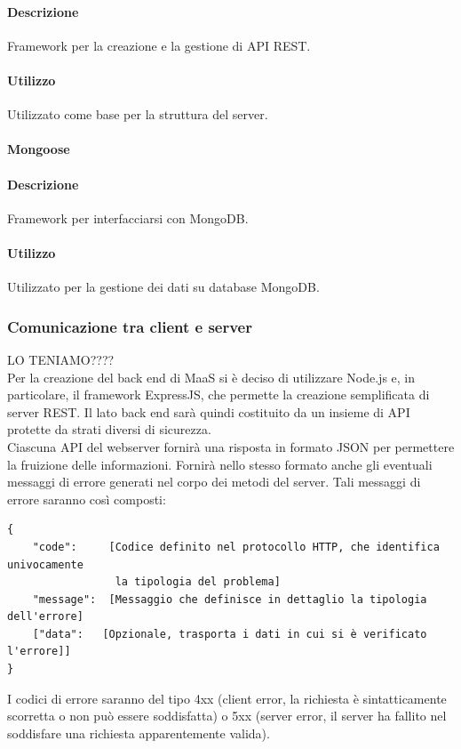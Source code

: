 \paragraph*{Descrizione}
Framework per la creazione e la gestione di API REST.

\paragraph*{Utilizzo}
Utilizzato come base per la struttura del server.

\paragraph{Mongoose}
\paragraph*{Descrizione}
Framework per interfacciarsi con MongoDB.

\paragraph*{Utilizzo}
Utilizzato per la gestione dei dati su database MongoDB.


\subsubsection{Comunicazione tra client e server}
\huge{LO TENIAMO????}\\
Per la creazione del back end di MaaS si è deciso di utilizzare Node.js e, in particolare, il framework ExpressJS, che permette la creazione semplificata di server REST. Il lato back end sarà quindi costituito da un insieme di API protette da strati diversi di sicurezza. \\
Ciascuna API del webserver fornirà una risposta in formato JSON per permettere la fruizione delle informazioni. Fornirà nello stesso formato anche gli eventuali messaggi di errore generati nel corpo dei metodi del server. Tali messaggi di errore saranno così composti: 
\begin{verbatim}
{
    "code":     [Codice definito nel protocollo HTTP, che identifica univocamente
                 la tipologia del problema]
    "message":  [Messaggio che definisce in dettaglio la tipologia dell'errore]
    ["data":   [Opzionale, trasporta i dati in cui si è verificato l'errore]]
}
\end{verbatim}
I codici di errore saranno del tipo 4xx (client error, la richiesta è sintatticamente scorretta o non può essere soddisfatta) o 5xx (server error, il server ha fallito nel soddisfare una richiesta apparentemente valida).
